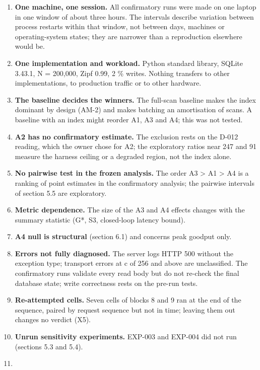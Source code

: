 \documentclass[
]{article}
\providecommand{\tightlist}{%
  \setlength{\itemsep}{0pt}\setlength{\parskip}{0pt}}
\begin{document}
\begin{enumerate}
\def\labelenumi{\arabic{enumi}.}
\tightlist
\item
  \textbf{One machine, one session.} All confirmatory runs were made on
  one laptop in one window of about three hours. The intervals describe
  variation between process restarts within that window, not between
  days, machines or operating-system states; they are narrower than a
  reproduction elsewhere would be.
\item
  \textbf{One implementation and workload.} Python standard library,
  SQLite 3.43.1, N = 200,000, Zipf 0.99, 2 \% writes. Nothing transfers
  to other implementations, to production traffic or to other hardware.
\item
  \textbf{The baseline decides the winners.} The full-scan baseline
  makes the index dominant by design (AM-2) and makes batching an
  amortisation of scans. A baseline with an index might reorder A1, A3
  and A4; this was not tested.
\item
  \textbf{A2 has no confirmatory estimate.} The exclusion rests on the
  D-012 reading, which the owner chose for A2; the exploratory ratios
  near 247 and 91 measure the harness ceiling or a degraded region, not
  the index alone.
\item
  \textbf{No pairwise test in the frozen analysis.} The order A3
  \textgreater{} A1 \textgreater{} A4 is a ranking of point estimates in
  the confirmatory analysis; the pairwise intervals of section 5.5 are
  exploratory.
\item
  \textbf{Metric dependence.} The size of the A3 and A4 effects changes
  with the summary statistic (G*, S3, closed-loop latency bound).
\item
  \textbf{A4 null is structural} (section 6.1) and concerns peak goodput
  only.
\item
  \textbf{Errors not fully diagnosed.} The server logs HTTP 500 without
  the exception type; transport errors at c of 256 and above are
  unclassified. The confirmatory runs validate every read body but do
  not re-check the final database state; write correctness rests on the
  pre-run tests.
\item
  \textbf{Re-attempted cells.} Seven cells of blocks 8 and 9 ran at the
  end of the sequence, paired by request sequence but not in time;
  leaving them out changes no verdict (X5).
\item
  \textbf{Unrun sensitivity experiments.} EXP-003 and EXP-004 did not
  run (sections 5.3 and 5.4).
\item

\end{enumerate}
\end{document}
